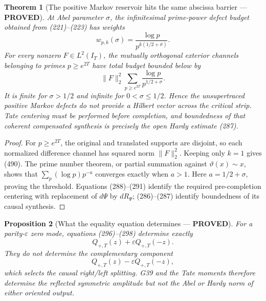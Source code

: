 \documentclass[11pt]{article}
\newtheorem{theorem}{Theorem}
\newtheorem{proposition}[theorem]{Proposition}
\newcommand{\PROVED}{\textcolor{green!45!black}{\textbf{PROVED}}}
\begin{document}
\begin{theorem}[The positive Markov reservoir hits the same abscissa barrier
--- \PROVED]
At Abel parameter \(\sigma\), the infinitesimal prime-power defect budget
obtained from (221)--(223) has weights
\begin{equation}
 w_{p,k}(\sigma)=\frac{\log p}{p^{k(1/2+\sigma)}}.    \tag{489}
\end{equation}
For every nonzero \(F\in L^2(I_T)\), the mutually orthogonal exterior
channels belonging to primes \(p\ge e^{2T}\) have total budget bounded below
by
\begin{equation}
 \|F\|_2^2\sum_{p\ge e^{2T}}
       \frac{\log p}{p^{1/2+\sigma}}.                \tag{490}
\end{equation}
It is finite for \(\sigma>1/2\) and infinite for
\(0<\sigma\le1/2\).  Hence the unsupertraced positive Markov defects do not
provide a Hilbert vector across the critical strip.  Tate centering must be
performed before completion, and boundedness of that coherent compensated
synthesis is precisely the open Hardy estimate (287).
\end{theorem}

\begin{proof}
For \(p\ge e^{2T}\), the original and translated supports are disjoint, so
each normalized difference channel has squared norm \(\|F\|_2^2\).  Keeping
only \(k=1\) gives (490).  The prime number theorem, or partial summation
against \(\vartheta(x)\sim x\), shows that
\(\sum_p(\log p)p^{-a}\) converges exactly when \(a>1\).  Here
\(a=1/2+\sigma\), proving the threshold.  Equations (288)--(291) identify
the required pre-completion centering with replacement of \(d\Psi\) by
\(dR_\Psi\); (286)--(287) identify boundedness of its causal synthesis.
\end{proof}

\begin{proposition}[What the equality equation determines --- \PROVED]
For a parity-\(\varepsilon\) zero mode, equations (296)--(298) determine
exactly
\begin{equation}
 Q_{+,T}(z)+\varepsilon Q_{+,T}(-z).                 \tag{491}
\end{equation}
They do not determine the complementary component
\begin{equation}
 Q_{+,T}(z)-\varepsilon Q_{+,T}(-z),                 \tag{492}
\end{equation}
which selects the causal right/left splitting.  G39 and the Tate moments
therefore determine the reflected symmetric amplitude but not the Abel or
Hardy norm of either oriented output.
\end{proposition}
\end{document}
